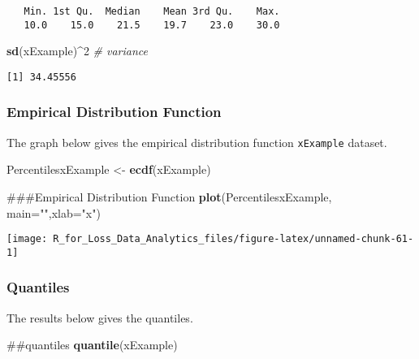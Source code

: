 \documentclass[]{book}
\newenvironment{Shaded}{\begin{snugshade}}{\end{snugshade}}
\newcommand{\KeywordTok}[1]{\textcolor[rgb]{0.13,0.29,0.53}{\textbf{#1}}}
\newcommand{\DataTypeTok}[1]{\textcolor[rgb]{0.13,0.29,0.53}{#1}}
\newcommand{\DecValTok}[1]{\textcolor[rgb]{0.00,0.00,0.81}{#1}}
\newcommand{\StringTok}[1]{\textcolor[rgb]{0.31,0.60,0.02}{#1}}
\newcommand{\CommentTok}[1]{\textcolor[rgb]{0.56,0.35,0.01}{\textit{#1}}}
\newcommand{\OperatorTok}[1]{\textcolor[rgb]{0.81,0.36,0.00}{\textbf{#1}}}
\newcommand{\NormalTok}[1]{#1}
\theoremstyle{definition}
\theoremstyle{definition}
\theoremstyle{definition}
\theoremstyle{remark}
\begin{document}
\begin{verbatim}
   Min. 1st Qu.  Median    Mean 3rd Qu.    Max. 
   10.0    15.0    21.5    19.7    23.0    30.0 
\end{verbatim}

\begin{Shaded}
\begin{Highlighting}[]
\KeywordTok{sd}\NormalTok{(xExample)}\OperatorTok{^}\DecValTok{2}   \CommentTok{# variance }
\end{Highlighting}
\end{Shaded}

\begin{verbatim}
[1] 34.45556
\end{verbatim}

\subsubsection{Empirical Distribution
Function}\label{empirical-distribution-function}

The graph below gives the empirical distribution function
\texttt{xExample} dataset.

\begin{Shaded}
\begin{Highlighting}[]
\NormalTok{PercentilesxExample <-}\StringTok{ }\KeywordTok{ecdf}\NormalTok{(xExample)}

\NormalTok{###Empirical Distribution Function}
\KeywordTok{plot}\NormalTok{(PercentilesxExample, }\DataTypeTok{main=}\StringTok{""}\NormalTok{,}\DataTypeTok{xlab=}\StringTok{"x"}\NormalTok{)}
\end{Highlighting}
\end{Shaded}

\begin{center}\texttt{[image: R\_for\_Loss\_Data\_Analytics\_files/figure-latex/unnamed-chunk-61-1]} \end{center}

\subsubsection{Quantiles}\label{quantiles}

The results below gives the quantiles.

\begin{Shaded}
\begin{Highlighting}[]
\NormalTok{##quantiles }
\KeywordTok{quantile}\NormalTok{(xExample)}
\end{Highlighting}
\end{Shaded}
\end{document}
